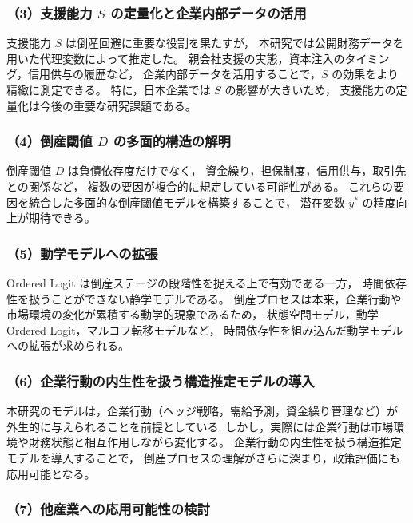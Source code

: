 \subsubsection*{（3）支援能力 $S$ の定量化と企業内部データの活用}

支援能力 $S$ は倒産回避に重要な役割を果たすが，
本研究では公開財務データを用いた代理変数によって推定した。
親会社支援の実態，資本注入のタイミング，信用供与の履歴など，
企業内部データを活用することで，$S$ の効果をより精緻に測定できる。
特に，日本企業では $S$ の影響が大きいため，
支援能力の定量化は今後の重要な研究課題である。

\subsubsection*{（4）倒産閾値 $D$ の多面的構造の解明}

倒産閾値 $D$ は負債依存度だけでなく，
資金繰り，担保制度，信用供与，取引先との関係など，
複数の要因が複合的に規定している可能性がある。
これらの要因を統合した多面的な倒産閾値モデルを構築することで，
潜在変数 $y^*$ の精度向上が期待できる。

\subsubsection*{（5）動学モデルへの拡張}

Ordered Logit は倒産ステージの段階性を捉える上で有効である一方，
時間依存性を扱うことができない静学モデルである。
倒産プロセスは本来，企業行動や市場環境の変化が累積する動学的現象であるため，
状態空間モデル，動学 Ordered Logit，マルコフ転移モデルなど，
時間依存性を組み込んだ動学モデルへの拡張が求められる。

\subsubsection*{（6）企業行動の内生性を扱う構造推定モデルの導入}

本研究のモデルは，企業行動（ヘッジ戦略，需給予測，資金繰り管理など）が
外生的に与えられることを前提としている.
しかし，実際には企業行動は市場環境や財務状態と相互作用しながら変化する。
企業行動の内生性を扱う構造推定モデルを導入することで，
倒産プロセスの理解がさらに深まり，政策評価にも応用可能となる。

\subsubsection*{（7）他産業への応用可能性の検討}

